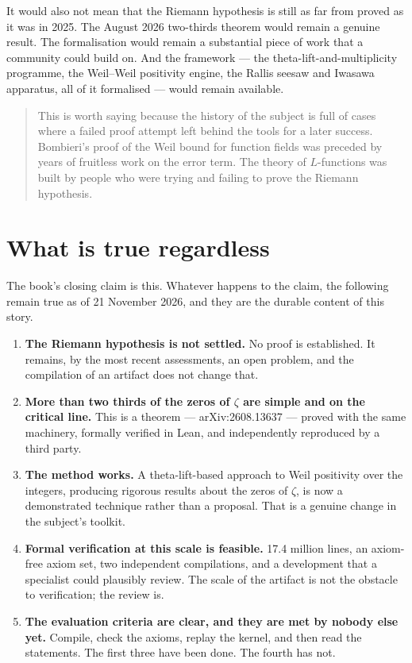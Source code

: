 It would also not mean that the Riemann hypothesis is still as far from
proved as it was in 2025. The August 2026 two-thirds theorem would remain a
genuine result. The formalisation would remain a substantial piece of work
that a community could build on. And the framework --- the
theta-lift-and-multiplicity programme, the Weil--Weil positivity engine, the
Rallis seesaw and Iwasawa apparatus, all of it formalised --- would remain
available.

\begin{quote}
This is worth saying because the history of the subject is full of cases where
a failed proof attempt left behind the tools for a later success. Bombieri's
proof of the Weil bound for function fields was preceded by years of
fruitless work on the error term. The theory of $L$-functions was built by
people who were trying and failing to prove the Riemann hypothesis.
\end{quote}

\section{What is true regardless}The book's closing claim is this. Whatever happens to the claim, the following
remain true as of 21 November 2026, and they are the durable content of this
story.

\begin{enumerate}
\item \textbf{The Riemann hypothesis is not settled.} No proof is established.
It remains, by the most recent assessments, an open problem, and the
compilation of an artifact does not change that.

\item \textbf{More than two thirds of the zeros of $\zeta$ are simple and on
the critical line.} This is a theorem --- arXiv:2608.13637 --- proved with
the same machinery, formally verified in Lean, and independently reproduced by
a third party.

\item \textbf{The method works.} A theta-lift-based approach to Weil positivity
over the integers, producing rigorous results about the zeros of $\zeta$, is
now a demonstrated technique rather than a proposal. That is a genuine change
in the subject's toolkit.

\item \textbf{Formal verification at this scale is feasible.} 17.4 million
lines, an axiom-free axiom set, two independent compilations, and a
development that a specialist could plausibly review. The scale of the
artifact is not the obstacle to verification; the review is.

\item \textbf{The evaluation criteria are clear, and they are met by nobody
else yet.} Compile, check the axioms, replay the kernel, and then read the
statements. The first three have been done. The fourth has not.
\end{enumerate}

